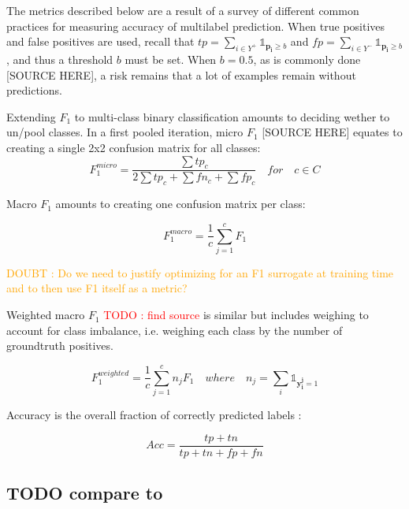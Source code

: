 \documentclass[sigconf,natbib,screen=true,review=true,anonymous]{acmart}
\newcommand\todo[1]{\textcolor{red}{TODO : #1}}
\newcommand\doubt[1]{\textcolor{orange}{DOUBT : #1}}
\begin{document}





The metrics described below are a result of a survey of different common practices for measuring accuracy of multilabel prediction. When true positives and false positives are used, recall that \(t p=\sum_{i \in Y^{+}} \mathds{1}_{\mathbf{p_i} \geq b}\) and \(f p=\sum_{i \in Y^{-}} \mathds{1}_{\mathbf{p_i} \geq b}\), and thus a threshold \(b\) must be set. When \(b = 0.5\), as is commonly done [SOURCE HERE], a risk remains that a lot of examples remain without predictions.

Extending \(F_1\) to multi-class binary classification amounts to deciding wether to un/pool classes.
In a first pooled iteration, micro \(F_1\) [SOURCE HERE] equates to creating a single 2x2 confusion matrix for all classes:
$$F_1^{micro} = \frac{\sum tp_c}{2 \sum tp_c + \sum fn_c + \sum fp_c} \quad for \quad c \in C$$

Macro \(F_1\) \cite{threshForF1} amounts to creating one confusion matrix per class:

$$F_1^{macro} = \frac{1}{c} \sum_{j=1}^c F_1$$

\doubt{Do we need to justify optimizing for an F1 surrogate at training time and to then use F1 itself as a metric?}

Weighted macro \(F_1\) \todo{find source} is similar but includes weighing to account for class imbalance, i.e. weighing each class by the number of groundtruth positives.

$$F_1^{weighted} = \frac{1}{c} \sum_{j=1}^c n_j F_1 \quad where \quad n_j = \sum_i \mathds{1}_{\mathbf{y_i^j} = 1}$$


Accuracy is the overall fraction of correctly predicted labels \cite{threshForF1}:

$$
A c c=\frac{t p+t n}{t p+t n+f p+f n}
$$




\subsection*{{\color{red}\bfseries\sffamily TODO} compare to  \cite{lossComp}}
\label{sec:org360fa61}
\clearpage
\end{document}
